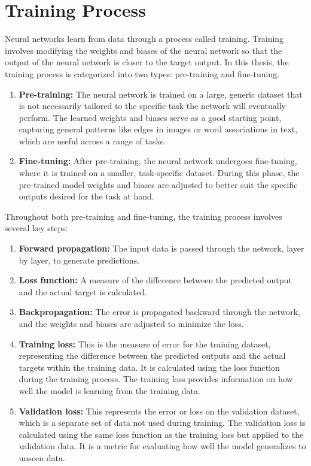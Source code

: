 \documentclass[english, ba, kiv, he, iso690numb, pdf, viewonly]{fasthesis}
\begin{document}
	\section{Training Process}
	
	Neural networks learn from data through a process called training. Training involves modifying the weights and biases of the neural network so that the output of the neural network is closer to the target output. In this thesis, the training process is categorized into two types: pre-training and fine-tuning.
	\begin{enumerate}
		\item \textbf{Pre-training:} The neural network is trained on a large, generic dataset that is not necessarily tailored to the specific task the network will eventually perform. The learned weights and biases serve as a good starting point, capturing general patterns like edges in images or word associations in text, which are useful across a range of tasks.
		
		\item \textbf{Fine-tuning:} After pre-training, the neural network undergoes fine-tuning, where it is trained on a smaller, task-specific dataset. During this phase, the pre-trained model weights and biases are adjusted to better suit the specific outputs desired for the task at hand.
		
	\end{enumerate}
	Throughout both pre-training and fine-tuning, the training process involves several key steps:
	\begin{enumerate}
		\item \textbf{Forward propagation:} The input data is passed through the network, layer by layer, to generate predictions.
		
		\item \textbf{Loss function:} A measure of the difference between the predicted output and the actual target is calculated.
		
		\item \textbf{Backpropagation:} The error is propagated backward through the network, and the weights and biases are adjusted to minimize the loss.
		
		\item \textbf{Training loss:} This is the measure of error for the training dataset, representing the difference between the predicted outputs and the actual targets within the training data. It is calculated using the loss function during the training process. The training loss provides information on how well the model is learning from the training data.
		
		\item \textbf{Validation loss:} This represents the error or loss on the validation dataset, which is a separate set of data not used during training. The validation loss is calculated using the same loss function as the training loss but applied to the validation data. It is a metric for evaluating how well the model generalizes to unseen data.
	\end{enumerate}
	
\end{document}
